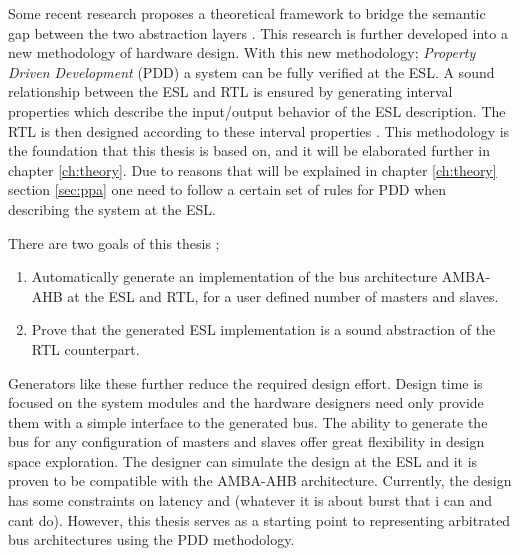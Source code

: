Some recent research proposes a theoretical framework to bridge the semantic gap between the two abstraction layers \cite{2014-UrdahlStoffel.etal}. This research is further developed into a new methodology of hardware design. With this new methodology; \textit{Property Driven Development} (PDD) a system can be fully verified at the ESL. A sound relationship between the ESL and RTL is ensured by generating interval properties which describe the input/output behavior of the ESL description. The RTL is then designed according to these interval properties \cite{pddref}. This methodology is the foundation that this thesis is based on, and it will be elaborated further in chapter \ref{ch:theory}. Due to reasons that will be explained in chapter \ref{ch:theory} section \ref{sec:ppa} one need to follow a certain set of rules for PDD when describing the system at the ESL. \par 
There are two goals of this thesis ; \\
\begin{enumerate}
 \item Automatically generate an implementation of the bus architecture AMBA-AHB at the ESL and RTL, for a user defined number of masters and slaves.
 \item Prove that the generated ESL implementation is a sound abstraction of the RTL counterpart.
\end{enumerate}

Generators like these further reduce the required design effort. Design time is focused on the system modules and the hardware designers need only provide them with a simple interface to the generated bus. The ability to generate the bus for any configuration of masters and slaves offer great flexibility in design space exploration. The designer can simulate the design at the ESL and it is proven to be compatible with the AMBA-AHB architecture. Currently, the design has some constraints on latency and (whatever it is about burst that i can and cant do). However, this thesis serves as a starting point to representing arbitrated bus architectures using the PDD methodology.   


 


